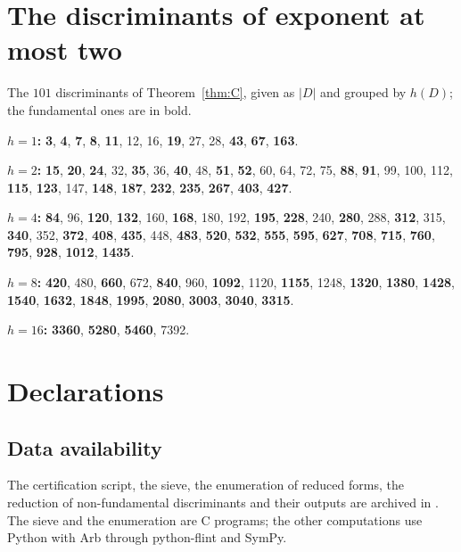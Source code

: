 \documentclass[11pt]{amsart}
\theoremstyle{definition}
\theoremstyle{remark}
\numberwithin{equation}{section}
\begin{document}
\section{The discriminants of exponent at most two}\label{app:list}

The $101$ discriminants of Theorem~\ref{thm:C}, given as $|D|$ and grouped by $h(D)$; the fundamental ones are in bold.

\smallskip
\noindent\textbf{$h=1$:} \textbf{3}, \textbf{4}, \textbf{7}, \textbf{8}, \textbf{11}, 12, 16, \textbf{19}, 27, 28, \textbf{43}, \textbf{67}, \textbf{163}.

\noindent\textbf{$h=2$:} \textbf{15}, \textbf{20}, \textbf{24}, 32, \textbf{35}, 36, \textbf{40}, 48, \textbf{51}, \textbf{52}, 60, 64, 72, 75, \textbf{88}, \textbf{91}, 99, 100, 112, \textbf{115}, \textbf{123}, 147, \textbf{148}, \textbf{187}, \textbf{232}, \textbf{235}, \textbf{267}, \textbf{403}, \textbf{427}.

\noindent\textbf{$h=4$:} \textbf{84}, 96, \textbf{120}, \textbf{132}, 160, \textbf{168}, 180, 192, \textbf{195}, \textbf{228}, 240, \textbf{280}, 288, \textbf{312}, 315, \textbf{340}, 352, \textbf{372}, \textbf{408}, \textbf{435}, 448, \textbf{483}, \textbf{520}, \textbf{532}, \textbf{555}, \textbf{595}, \textbf{627}, \textbf{708}, \textbf{715}, \textbf{760}, \textbf{795}, \textbf{928}, \textbf{1012}, \textbf{1435}.

\noindent\textbf{$h=8$:} \textbf{420}, 480, \textbf{660}, 672, \textbf{840}, 960, \textbf{1092}, 1120, \textbf{1155}, 1248, \textbf{1320}, \textbf{1380}, \textbf{1428}, \textbf{1540}, \textbf{1632}, \textbf{1848}, \textbf{1995}, \textbf{2080}, \textbf{3003}, \textbf{3040}, \textbf{3315}.

\noindent\textbf{$h=16$:} \textbf{3360}, \textbf{5280}, \textbf{5460}, 7392.

\section*{Declarations}

\subsection*{Data availability}
The certification script, the sieve, the enumeration of reduced forms, the reduction of non-fundamental discriminants and their outputs are archived in \cite{Archive}. The sieve and the enumeration are C programs; the other computations use Python with Arb through python-flint and SymPy.
\end{document}
